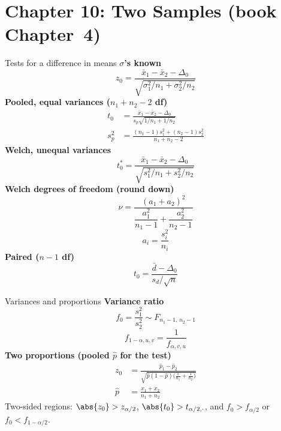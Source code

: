 \section{Chapter 10: Two Samples (book Chapter~4)}

\begin{formulabox}{Tests for a difference in means}
\textbf{$\sigma$'s known}
\[ z_0=\frac{\bar{x}_1-\bar{x}_2-\Delta_0}{\sqrt{\sigma_1^2/n_1+\sigma_2^2/n_2}} \]
\textbf{Pooled, equal variances ($n_1+n_2-2$ df)}
\[ \begin{aligned}t_0&=\frac{\bar{x}_1-\bar{x}_2-\Delta_0}{s_p\sqrt{1/n_1+1/n_2}}\\[4pt] s_p^2&=\frac{(n_1-1)s_1^2+(n_2-1)s_2^2}{n_1+n_2-2}\end{aligned} \]
\textbf{Welch, unequal variances}
\[ t_0^*=\frac{\bar{x}_1-\bar{x}_2-\Delta_0}{\sqrt{s_1^2/n_1+s_2^2/n_2}} \]
\textbf{Welch degrees of freedom (round down)}
\[ \nu=\frac{(a_1+a_2)^2}{\dfrac{a_1^2}{n_1-1}+\dfrac{a_2^2}{n_2-1}} \]
\[ a_i=\frac{s_i^2}{n_i} \]
\textbf{Paired ($n-1$ df)}
\[ t_0=\frac{\bar{d}-\Delta_0}{s_d/\sqrt n} \]
\end{formulabox}

\begin{formulabox}{Variances and proportions}
\textbf{Variance ratio}
\[ f_0=\frac{s_1^2}{s_2^2}\sim F_{n_1-1,\,n_2-1} \]
\[ f_{1-\alpha,u,v}=\frac1{f_{\alpha,v,u}} \]
\textbf{Two proportions (pooled $\hat{p}$ for the test)}
\[ \begin{aligned}z_0&=\frac{\hat{p}_1-\hat{p}_2}{\sqrt{\hat{p}(1-\hat{p})\big(\frac1{n_1}+\frac1{n_2}\big)}}\\[4pt] \hat{p}&=\frac{x_1+x_2}{n_1+n_2}\end{aligned} \]
Two-sided regions: $\abs{z_0}>z_{\alpha/2}$, $\abs{t_0}>t_{\alpha/2,\cdot}$, and $f_0>f_{\alpha/2}$ or $f_0<f_{1-\alpha/2}$.
\end{formulabox}

